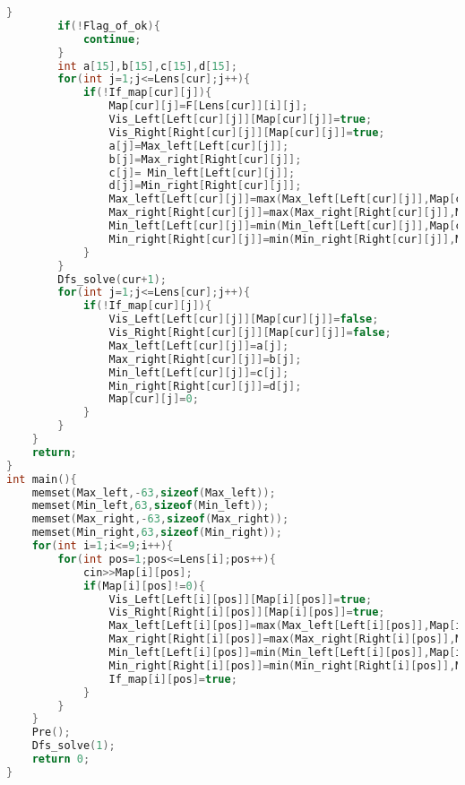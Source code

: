 \begin{lstlisting}[language=C++, firstnumber=1]
        }
        if(!Flag_of_ok){
            continue;
        }
        int a[15],b[15],c[15],d[15];
        for(int j=1;j<=Lens[cur];j++){
            if(!If_map[cur][j]){
                Map[cur][j]=F[Lens[cur]][i][j];
                Vis_Left[Left[cur][j]][Map[cur][j]]=true;
                Vis_Right[Right[cur][j]][Map[cur][j]]=true;
                a[j]=Max_left[Left[cur][j]];
                b[j]=Max_right[Right[cur][j]];
                c[j]= Min_left[Left[cur][j]];
                d[j]=Min_right[Right[cur][j]];
                Max_left[Left[cur][j]]=max(Max_left[Left[cur][j]],Map[cur][j]);
                Max_right[Right[cur][j]]=max(Max_right[Right[cur][j]],Map[cur][j]);
                Min_left[Left[cur][j]]=min(Min_left[Left[cur][j]],Map[cur][j]);
                Min_right[Right[cur][j]]=min(Min_right[Right[cur][j]],Map[cur][j]);
            }
        }
        Dfs_solve(cur+1);
        for(int j=1;j<=Lens[cur];j++){
            if(!If_map[cur][j]){
                Vis_Left[Left[cur][j]][Map[cur][j]]=false;
                Vis_Right[Right[cur][j]][Map[cur][j]]=false;
                Max_left[Left[cur][j]]=a[j];
                Max_right[Right[cur][j]]=b[j];
                Min_left[Left[cur][j]]=c[j];
                Min_right[Right[cur][j]]=d[j];
                Map[cur][j]=0;
            }
        }
    }
    return;
}
int main(){
    memset(Max_left,-63,sizeof(Max_left));
    memset(Min_left,63,sizeof(Min_left));
    memset(Max_right,-63,sizeof(Max_right));
    memset(Min_right,63,sizeof(Min_right));
    for(int i=1;i<=9;i++){
        for(int pos=1;pos<=Lens[i];pos++){
            cin>>Map[i][pos];
            if(Map[i][pos]!=0){
                Vis_Left[Left[i][pos]][Map[i][pos]]=true;
                Vis_Right[Right[i][pos]][Map[i][pos]]=true;
                Max_left[Left[i][pos]]=max(Max_left[Left[i][pos]],Map[i][pos]);
                Max_right[Right[i][pos]]=max(Max_right[Right[i][pos]],Map[i][pos]);
                Min_left[Left[i][pos]]=min(Min_left[Left[i][pos]],Map[i][pos]);
                Min_right[Right[i][pos]]=min(Min_right[Right[i][pos]],Map[i][pos]);
                If_map[i][pos]=true;
            }
        }
    }
    Pre();
    Dfs_solve(1);
    return 0;
}
\end{lstlisting}
